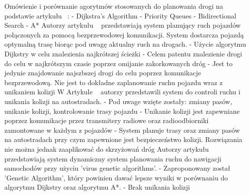 \newline
\newline
Omówienie i porównanie agorytmów stosowanych do planowania drogi na podstawie artykułu ~\cite{delling2009engineering}:
  \newline
  - Dijkstra's Algorithm
  \newline
  - Priority Queues
  \newline
  - Bidirectional Search
  \newline
  - A*
  \newline
\newline
\newline
Autorzy artykułu ~\cite{gazis1997optimal} przedstawiają system planujący ruch pojazdów połączonych za pomocą bezprzewodowej komunikacji. System dostarcza pojazdą optymalną trasę biorąc pod uwagę aktualny ruch na drogach.
\newline
- Użycie algorytmu Dijkstry w celu znalezienia najkrótszej ścieżki
\newline
- Celem patentu znalezienie drogi do celu w najkrótszym czasie poprzez omijanie zakorkowanych dróg
\newline
- Jest to jedynie znajdowanie najszbszej drogi do celu poprzez komunikacje bezprzewodową. Nie jest to dokładne zaplanowanie ruchu pojazdu wraz z unikaniem kolizji
\newline
\newline
W Artykule ~\cite{broxmeyer1994vehicle} autorzy przedstawili system do controli ruchu i unikania kolizji na autostradach.
\newline
- Pod uwage wzięte zostały: zmiany pasów, unikanie kolizji, kontrolowanie trasy pojazdu
\newline
- Unikanie kolizji jest zapewniane poprzez komunikacje przez transmitery radiowe oraz radioodbiorniki zamontowane w każdym z pojazdów
\newline
- System planuje trasy oraz zmiany pasów na autostradach przy czym zapewnione jest bezpieczeństwo kolizji. Rozwiązania nie można jednak zaaplikować do skrzyżowań dróg
\newline
\newline
Autorzy artykułu ~\cite{kanoh2007dynamic} przedstawiają system dynamiczny system planowania ruchu do nawigacji samochodów przy użyciu 'virus genetic algorithms'.
\newline
- Zaproponowany został 'Genetic Algorithm', który powinien dawać lepsze wyniki w porównaniu do algorytmu Dijkstry oraz algorytmu A*.
\newline
- Brak unikania kolizji
\newline

